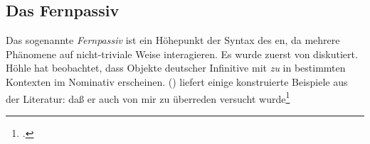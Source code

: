 






\subsection{Das Fernpassiv}
\label{sec-remote-passive-phen}

Das sogenannte \emph{Fernpassiv} ist ein Höhepunkt der Syntax des en, da mehrere
Phänomene auf nicht-triviale Weise interagieren. Es wurde zuerst von \citet[--176]{Hoehle78a} diskutiert. Höhle hat beobachtet, dass Objekte deutscher Infinitive mit \emph{zu} in bestimmten Kontexten im
Nominativ erscheinen. () liefert einige konstruierte Beispiele aus der Literatur:
\eal
\ex{}
daß  er        auch von mir zu überreden versucht wurde\footnote{
        .%
}

